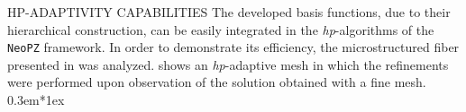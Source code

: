 \documentclass[debug]{beamer} %
\def\vspace{0.3em}{ }%
\begin{document}
\begin{frame}
    \begin{minipage}[t]{0.45\textwidth}
        \begin{block}{\boxnumber HP-ADAPTIVITY CAPABILITIES }
        The developed basis functions, due to their hierarchical construction, can be easily integrated in the \emph{hp}-algorithms of the \texttt{NeoPZ} framework\parencite{diazcalle15}. In order to demonstrate its efficiency, the microstructured fiber presented in \parencite{chiang11} was analyzed.  shows an \emph{hp}-adaptive mesh in which the refinements were performed upon observation of the solution obtained with a fine mesh.
        \vspace*{1ex}

	        \begin{figure}
	        	\centering
\end{figure}
\end{block}
\end{minipage}
\end{frame}
\end{document}
